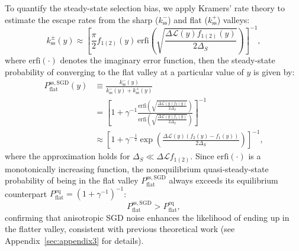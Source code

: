 \documentclass[aps,prx,reprint,superscriptaddress,longbibliography,nofootinbib,floatfix]{revtex4-2}
\begin{document}
To quantify the steady-state selection bias, we apply Kramers’ rate theory to estimate the escape rates from the sharp ($k_\mathrm{ss}^{-}$) and flat ($k_\mathrm{ss}^{+}$) valleys:
\begin{equation}
k_\mathrm{ss}^{\pm}(y)\approx \left[ \frac{\pi}{2}f_{1(2)}(y) \,\mathrm{erfi}\left(
\sqrt{\frac{\Delta \mathcal{L}(y)f_{1(2)}(y)}{2\Delta_S}}\right) \right]^{-1},
\end{equation}
where $\mathrm{erfi}(\cdot)$ denotes the imaginary error function, then the steady-state probability of converging to the flat valley at a particular value of $y$ is given by:
\begin{equation}
\begin{split}
    P_{\mathrm{flat}}^{\mathrm{ss,SGD}}(y)
    &\equiv\frac{k_\mathrm{ss}^{-}(y)}{k_\mathrm{ss}^{-}(y)+k_\mathrm{ss}^{+}(y)}   \\
    &= \left[1 + \gamma^{-1}\frac{\mathrm{erfi}\left(\sqrt{\frac{ \Delta \mathcal{L}(y)f_2(y)}{2\Delta_S}}\right)}
                     {\mathrm{erfi}\left(\sqrt{\frac{ \Delta \mathcal{L}(y)f_1(y)}{2\Delta_S}}\right)}\right]^{-1}  \\
    &\approx  \left[1 + \gamma^{-\frac{1}{2}}
    \exp\left(\frac{\Delta \mathcal{L}(y)(f_2(y)-f_1(y))}{2\Delta_S}\right)\right]^{-1},
\label{eq:ss_SGD}
\end{split}
\end{equation}
where the approximation holds for $\Delta_S \ll \Delta \mathcal{L} f_{1(2)}$. Since $\mathrm{erfi}(\cdot)$ is a monotonically increasing function, the nonequilibrium quasi-steady-state probability of being in the flat valley $P_{\mathrm{flat}}^{\mathrm{ss,SGD}}$ always exceeds its equilibrium counterpart $P_{\mathrm{flat}}^{\mathrm{eq}}= (1+\gamma^{-1})^{-1}$:
\begin{equation}
P_{\mathrm{flat}}^{\mathrm{ss,SGD}}>P_{\mathrm{flat}}^{\mathrm{eq}},
\label{eq:ss_eq}
\end{equation}
confirming that anisotropic SGD noise enhances the likelihood of ending up in the flatter valley, consistent with previous theoretical work \cite{xieDiffusionTheoryDeep2021} (see Appendix~\ref{sec:appendix3} for details).

\end{document}
